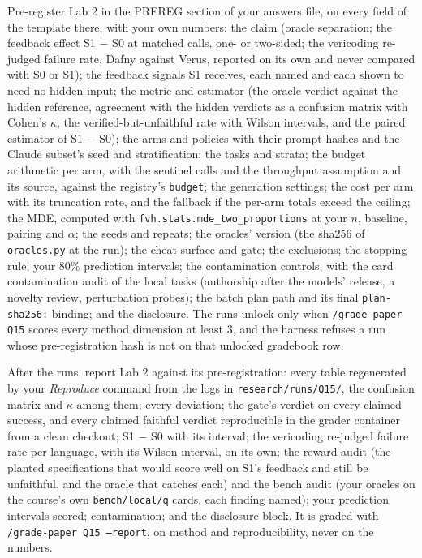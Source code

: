 \documentclass[11pt]{article}
\begin{document}
\begin{problem}\label{prob:B1}
Pre-register Lab 2 in the PREREG section of your answers file, on every field
of the template there, with your own numbers: the claim (oracle separation;
the feedback effect S1 $-$ S0 at matched calls, one- or two-sided; the
vericoding re-judged failure rate, Dafny against Verus, reported on its own
and never compared with S0 or S1); the feedback signals S1 receives, each
named and each shown to need no hidden input; the metric and estimator (the
oracle verdict against the hidden reference, agreement with the hidden
verdicts as a confusion matrix with Cohen's $\kappa$, the
verified-but-unfaithful rate with Wilson intervals, and the paired estimator
of S1 $-$ S0); the arms and policies with their prompt hashes and the Claude
subset's seed and stratification; the tasks and strata; the budget
arithmetic per arm, with the sentinel calls and the throughput assumption and
its source, against the registry's \texttt{budget}; the generation settings;
the cost per arm with its truncation rate, and the fallback if the per-arm
totals exceed the ceiling; the MDE, computed with
\texttt{fvh.stats.mde\_two\_proportions} at your $n$, baseline, pairing and
$\alpha$; the seeds and repeats; the oracles' version (the sha256 of
\texttt{oracles.py} at the run); the cheat surface and gate; the exclusions;
the stopping rule; your 80\% prediction intervals; the contamination
controls, with the card contamination audit of the local tasks
(authorship after the models' release, a novelty review, perturbation
probes); the batch plan path and its final \texttt{plan-sha256:} binding;
and the disclosure. The runs unlock only when
\texttt{/grade-paper Q15} scores every method dimension at least 3, and the
harness refuses a run whose pre-registration hash is not on that unlocked
gradebook row.
\end{problem}

\begin{problem}\label{prob:B2}
After the runs, report Lab 2 against its pre-registration: every table
regenerated by your \emph{Reproduce} command from the logs in
\texttt{research/runs/Q15/}, the confusion matrix and $\kappa$ among them;
every deviation; the gate's verdict on every claimed success, and every
claimed faithful verdict reproducible in the grader container from a clean
checkout; S1 $-$ S0 with its interval; the vericoding re-judged failure
rate per language, with its Wilson interval, on its own; the reward audit
(the planted specifications that would score well on S1's feedback and still
be unfaithful, and the oracle that catches each) and the bench audit (your
oracles on the course's own \texttt{bench/local/q} cards, each finding
named); your prediction intervals scored; contamination; and the disclosure
block. It is graded with \texttt{/grade-paper Q15 --report}, on method and
reproducibility, never on the numbers.
\end{problem}
\end{document}
